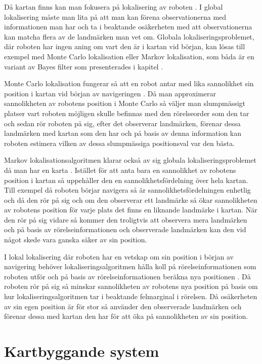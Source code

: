 Då kartan finns kan man fokusera på lokalisering av roboten \citep{982903}. I global lokalisering måste man lita på att man kan förena observationerna med informationen man har och ta i beaktande osäkerheten med att observationerna kan matcha flera av de landmärken man vet om. Globala lokaliseringsproblemet, där roboten har ingen aning om vart den är i kartan vid början, kan lösas till exempel med Monte Carlo lokalisation eller Markov lokalisation, som båda är en variant av Bayes filter som presenterades i kapitel  \citep{ProbabilisticRobotics}. 

Monte Carlo lokalisation fungerar så att en robot antar med lika sannolikhet sin position i kartan vid början av navigeringen \citep{montecarlo}. Då man approximerar sannolikheten av robotens position i Monte Carlo så väljer man slumpmässigt platser vart roboten möjligen skulle befinnas med den rörelseorder som den tar och sedan rör roboten på sig, efter det observerar landmärken, förenar dessa landmärken med kartan som den har och på basis av denna information kan roboten estimera vilken av dessa slumpmässiga positionsval var den bästa. 

Markov lokalisationsalgoritmen klarar också av sig globala lokaliseringsproblemet då man har en karta \citep{ProbabilisticRobotics}. Istället för att anta bara en sannolikhet av robotens position i kartan så uppehåller den en sannolikhetsfördelning över hela kartan. Till exempel då roboten börjar navigera så är sannolikhetsfördelningen enhetlig och då den rör på sig och om den observerar ett landmärke så ökar sannolikheten av robotens position för varje plats det finns en liknande landmärke i kartan. När den rör på sig vidare så kommer den troligtvis att observera mera landmärken och på basis av rörelseinformationen och observerade landmärken kan den vid något skede vara ganska säker av sin position.

I lokal lokalisering där roboten har en vetskap om sin position i början av navigering behöver lokaliseringsalgoritmen hålla koll på rörelseinformationen som roboten utför och på basis av rörelseinformationen beräkna nya positionen \citep{montecarlo,ProbabilisticRobotics}. Då roboten rör på sig så minskar sannolikheten av robotens nya position på basis om hur lokaliseringsalgoritmen tar i beaktande felmarginal i rörelsen. Då osäkerheten av sin egen position är för stor så använder den observerade landmärken och förenar dessa med kartan den har för att öka på sannolikheten av sin position. 

\section{Kartbyggande system}

